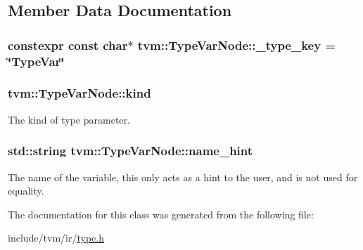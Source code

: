 \subsection{Member Data Documentation}
\subsubsection[{\texorpdfstring{\+\_\+type\+\_\+key}{_type_key}}]{\setlength{\rightskip}{0pt plus 5cm}constexpr const char$\ast$ tvm\+::\+Type\+Var\+Node\+::\+\_\+type\+\_\+key = \char`\"{}Type\+Var\char`\"{}\hspace{0.3cm}{\ttfamily [static]}}\hypertarget{classtvm_1_1TypeVarNode_acee77b1f71e1ecda9212a47d123e2c06}{}\label{classtvm_1_1TypeVarNode_acee77b1f71e1ecda9212a47d123e2c06}
\subsubsection[{\texorpdfstring{kind}{kind}}]{ tvm\+::\+Type\+Var\+Node\+::kind}\hypertarget{classtvm_1_1TypeVarNode_afc08e151afef3c4644ba8d2cd796106a}{}\label{classtvm_1_1TypeVarNode_afc08e151afef3c4644ba8d2cd796106a}


The kind of type parameter. 

\subsubsection[{\texorpdfstring{name\+\_\+hint}{name_hint}}]{\setlength{\rightskip}{0pt plus 5cm}std\+::string tvm\+::\+Type\+Var\+Node\+::name\+\_\+hint}\hypertarget{classtvm_1_1TypeVarNode_a417cf13dd23ee15ac8d1fb274fff46eb}{}\label{classtvm_1_1TypeVarNode_a417cf13dd23ee15ac8d1fb274fff46eb}


The name of the variable, this only acts as a hint to the user, and is not used for equality. 



The documentation for this class was generated from the following file\+:\begin{DoxyCompactItemize}
\item 
include/tvm/ir/\hyperlink{ir_2type_8h}{type.\+h}\end{DoxyCompactItemize}
